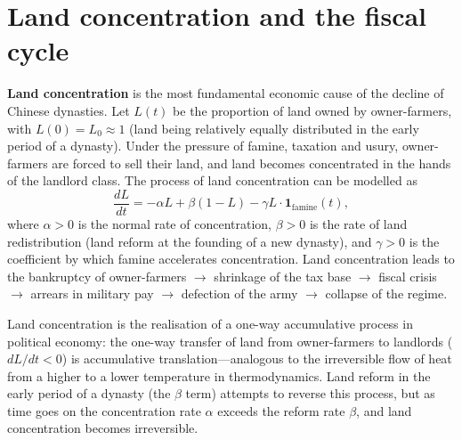 \section{Land concentration and the fiscal cycle}

\begin{definition}\label{def:land_concentration}
\textbf{Land concentration} is the most fundamental economic cause of the decline of Chinese dynasties. Let $L(t)$ be the proportion of land owned by owner-farmers, with $L(0) = L_0 \approx 1$ (land being relatively equally distributed in the early period of a dynasty). Under the pressure of famine, taxation and usury, owner-farmers are forced to sell their land, and land becomes concentrated in the hands of the landlord class. The process of land concentration can be modelled as
\[
\frac{dL}{dt} = -\alpha L + \beta(1-L) - \gamma L \cdot \mathbf{1}_{\text{famine}}(t),
\]
where $\alpha > 0$ is the normal rate of concentration, $\beta > 0$ is the rate of land redistribution (land reform at the founding of a new dynasty), and $\gamma > 0$ is the coefficient by which famine accelerates concentration. Land concentration leads to the bankruptcy of owner-farmers $\to$ shrinkage of the tax base $\to$ fiscal crisis $\to$ arrears in military pay $\to$ defection of the army $\to$ collapse of the regime.

Land concentration is the realisation of a one-way accumulative process in political economy: the one-way transfer of land from owner-farmers to landlords ($dL/dt < 0$) is accumulative translation---analogous to the irreversible flow of heat from a higher to a lower temperature in thermodynamics. Land reform in the early period of a dynasty (the $\beta$ term) attempts to reverse this process, but as time goes on the concentration rate $\alpha$ exceeds the reform rate $\beta$, and land concentration becomes irreversible.
\end{definition}

